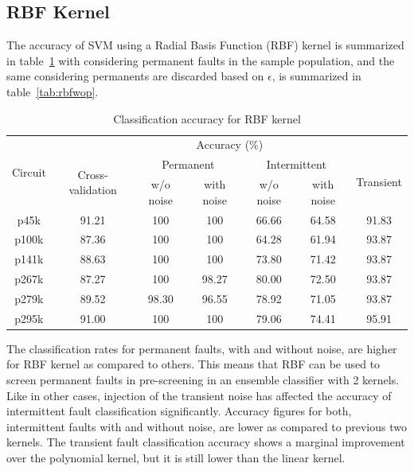 \subsection{RBF Kernel}

The accuracy of SVM using a Radial Basis Function (RBF) kernel is summarized in table~\ref{tab:rbfwp} with considering permanent faults in the sample population, and the same considering permanents are discarded based on $\epsilon$, is summarized in table~\ref{tab:rbfwop}.

\begin{table}[h]
\captionsetup{justification=centering}
\begin{tabular}{ccccccc}
\hline
\multirow{3}{*}{Circuit} & \multicolumn{6}{c}{Accuracy (\%)}\\ \cline{2-7} 
                         & \multirow{2}{*}{Cross-validation} & \multicolumn{2}{c}{Permanent} & \multicolumn{2}{c}{Intermittent} & \multirow{2}{*}{Transient} \\ \cline{3-6}
                         &                                   & w/o noise     & with noise    & w/o noise      & with noise      &                            \\ \hline
p45k                     & 91.21                             & 100           & 100           & 66.66          & 64.58           & 91.83                      \\
p100k                    & 87.36                             & 100           & 100           & 64.28          & 61.94           & 93.87                      \\
p141k                    & 88.63                             & 100           & 100           & 73.80          & 71.42           & 93.87                      \\
p267k                    & 87.27                             & 100           & 98.27         & 80.00          & 72.50           & 93.87                      \\
p279k                    & 89.52                             & 98.30         & 96.55         & 78.92          & 71.05           & 93.87                      \\
p295k                    & 91.00                             & 100           & 100           & 79.06          & 74.41           & 95.91                     \\
\hline                                                     
\end{tabular}
\caption {Classification accuracy for RBF kernel}
\label{tab:rbfwp}
\end{table}
The classification rates for permanent faults, with and without noise, are higher for RBF kernel as compared to others. This means that RBF can be used to screen permanent faults in pre-screening in an ensemble classifier with 2 kernels. Like in other cases, injection of the transient noise has affected the accuracy of intermittent fault classification significantly. Accuracy figures for both, intermittent faults with and without noise, are lower as compared to previous two kernels. The transient fault classification accuracy shows a marginal improvement over the polynomial kernel, but it is still lower than the linear kernel.

